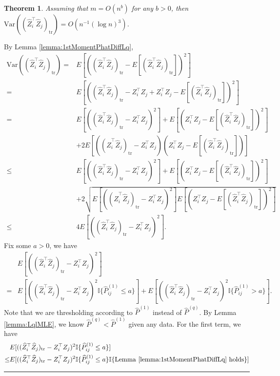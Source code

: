 \documentclass[a4paper]{article}
\newenvironment{proof}{{\bf Proof:  }}{\hfill\rule{2mm}{2mm}}
\newtheorem{theorem}[fact]{Theorem}
\renewcommand{\hat}{\widehat}
\begin{document}
\begin{theorem}
\label{thm:VarASELqproof}
Assuming that $m = O(n^b)$ for any $b > 0$, then $\mathrm{Var}((\hat{Z}_i^{\top} \hat{Z}_j)_{\mathrm{tr}}) = O(n^{-1} (\log n)^3)$.
\end{theorem}
\begin{proof}
By Lemma \ref{lemma:1stMomentPhatDiffLq},
\begin{align*}
	\mathrm{Var}((\hat{Z}_i^{\top} \hat{Z}_j)_{\mathrm{tr}})
    = & E[((\hat{Z}_i^{\top} \hat{Z}_j)_{\mathrm{tr}} - E[(\hat{Z}_i^{\top} \hat{Z}_j)_{\mathrm{tr}}])^2] \\
    = & E[((\hat{Z}_i^{\top} \hat{Z}_j)_{\mathrm{tr}} - Z_i^{\top} Z_j + Z_i^{\top} Z_j - E[(\hat{Z}_i^{\top} \hat{Z}_j)_{\mathrm{tr}}])^2] \\
    = & E[((\hat{Z}_i^{\top} \hat{Z}_j)_{\mathrm{tr}} - Z_i^{\top} Z_j)^2] + E[(Z_i^{\top} Z_j - E[(\hat{Z}_i^{\top} \hat{Z}_j)_{\mathrm{tr}}])^2] \\ 
    & + 2E[((\hat{Z}_i^{\top} \hat{Z}_j)_{\mathrm{tr}} - Z_i^{\top} Z_j)(Z_i^{\top} Z_j - E[(\hat{Z}_i^{\top} \hat{Z}_j)_{\mathrm{tr}}])] \\
    \le & E[((\hat{Z}_i^{\top} \hat{Z}_j)_{\mathrm{tr}} - Z_i^{\top} Z_j)^2] + E[(Z_i^{\top} Z_j - E[(\hat{Z}_i^{\top} \hat{Z}_j)_{\mathrm{tr}}])^2] \\ 
    & + 2\sqrt{E[((\hat{Z}_i^{\top} \hat{Z}_j)_{\mathrm{tr}} - Z_i^{\top} Z_j)^2] E[(Z_i^{\top} Z_j - E[(\hat{Z}_i^{\top} \hat{Z}_j)_{\mathrm{tr}}])^2]} \\
    \le & 4 E[((\hat{Z}_i^{\top} \hat{Z}_j)_{\mathrm{tr}} - Z_i^{\top} Z_j)^2].
\end{align*}
Fix some $a > 0$, we have
\begin{align*}
	& E[((\hat{Z}_i^{\top} \hat{Z}_j)_{\mathrm{tr}} - Z_i^{\top} Z_j)^2] \\
	= & E[((\hat{Z}_i^{\top} \hat{Z}_j)_{\mathrm{tr}} - Z_i^{\top} Z_j)^2 \mathbb{I}\{\hat{P}^{(1)}_{ij} \le a\}]
	+ E[((\hat{Z}_i^{\top} \hat{Z}_j)_{\mathrm{tr}} - Z_i^{\top} Z_j)^2 \mathbb{I}\{\hat{P}^{(1)}_{ij} > a\}].
\end{align*}
Note that we are thresholding according to $\hat{P}^{(1)}$ instead of $\hat{P}^{(q)}$. By Lemma \ref{lemma:LqlMLE}, we know $\hat{P}^{(q)} < \hat{P}^{(1)}$ given any data.
For the first term, we have
\begin{align*}
	& E[((\hat{Z}_i^{\top} \hat{Z}_j)_{\mathrm{tr}} - Z_i^{\top} Z_j)^2 \mathbb{I}\{\hat{P}^{(1)}_{ij} \le a\}] \\
	\le & E[((\hat{Z}_i^{\top} \hat{Z}_j)_{\mathrm{tr}} - Z_i^{\top} Z_j)^2 \mathbb{I}\{\hat{P}^{(1)}_{ij} \le a\} \mathbb{I}\{\mathrm{Lemma\ } \ref{lemma:1stMomentPhatDiffLq} \mathrm{\ holds}\}] \\

\end{align*}
\end{proof}
\end{document}
